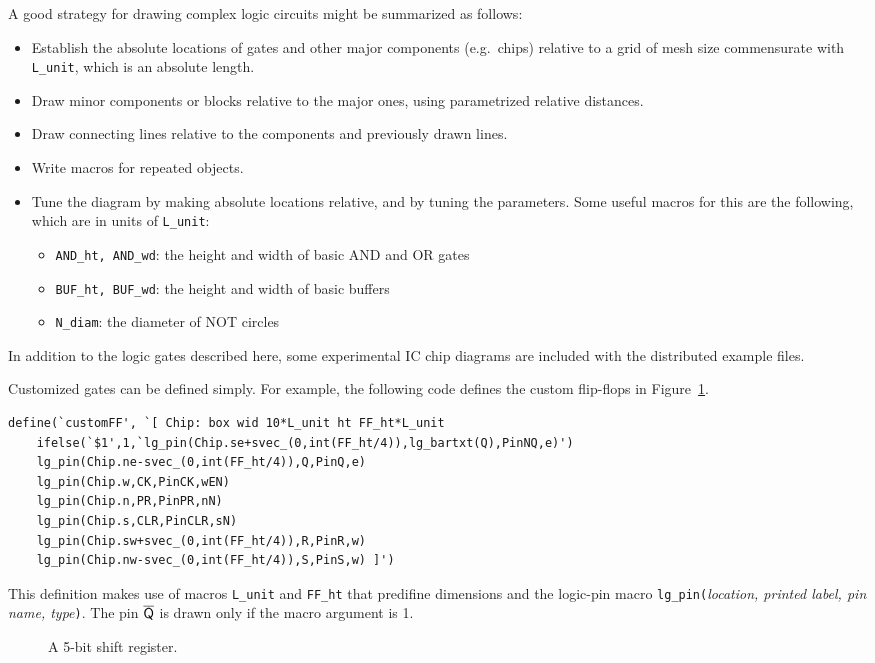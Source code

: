 A good strategy for drawing complex logic circuits might be summarized
as follows:
\begin{itemize}
\item Establish the absolute locations of gates and other major components
  (e.g.\ chips) relative to a grid of mesh size commensurate with
  {\tt L\_unit}, which is an absolute length.
\item Draw minor components or blocks relative to the major ones, using
   parametrized relative distances.
\item Draw connecting lines relative to the components and previously drawn
   lines.
\item Write macros for repeated objects.
\item Tune the diagram by making absolute locations relative, and by tuning
   the parameters.
   Some useful macros for this are the following, which are in units of
  {\tt L\_unit}:
   \begin{itemize}
   \item[] {\tt AND\_ht, AND\_wd}: the height and width of basic AND and
     OR gates
   \item[] {\tt BUF\_ht, BUF\_wd}: the height and width of basic buffers
   \item[] {\tt N\_diam}: the diameter of NOT circles
   \end{itemize}
   \end{itemize}
In addition to the logic gates described here, some experimental
IC chip diagrams are included with the distributed example files.

Customized gates can be defined simply.
For example, the following code defines the custom flip-flops in
Figure~\ref{ShiftR}.
\begin{verbatim}
define(`customFF', `[ Chip: box wid 10*L_unit ht FF_ht*L_unit
    ifelse(`$1',1,`lg_pin(Chip.se+svec_(0,int(FF_ht/4)),lg_bartxt(Q),PinNQ,e)')
    lg_pin(Chip.ne-svec_(0,int(FF_ht/4)),Q,PinQ,e)
    lg_pin(Chip.w,CK,PinCK,wEN)
    lg_pin(Chip.n,PR,PinPR,nN)
    lg_pin(Chip.s,CLR,PinCLR,sN)
    lg_pin(Chip.sw+svec_(0,int(FF_ht/4)),R,PinR,w)
    lg_pin(Chip.nw-svec_(0,int(FF_ht/4)),S,PinS,w) ]')
\end{verbatim}
This definition makes use of macros \verb|L_unit| and
\verb|FF_ht| that predifine dimensions and the
logic-pin macro \verb|lg_pin(|{\sl location, printed label, pin name,
type}\verb|)|.  The pin $\overline{\hbox{\sf Q}}$ is drawn only if the
macro argument is 1.
\begin{figure}[h!b]
   
   \caption{A 5-bit shift register.}
   \label{ShiftR}
   \end{figure}

